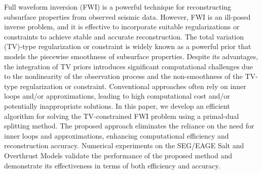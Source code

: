 Full waveform inversion (FWI) is a powerful technique for reconstructing subsurface properties from observed seismic data.
However, FWI is an ill-posed inverse problem, and it is effective to incorporate suitable regularizations or constraints to achieve stable and accurate reconstruction.
The total variation (TV)-type regularization or constraint is widely known as a powerful prior that models the piecewise smoothness of subsurface properties.
Despite its advantages, the integration of TV priors introduces significant computational challenges due to the nonlinearity of the observation process and the non-smoothness of the TV-type regularization or constraint.
Conventional approaches often rely on inner loops and/or approximations, leading to high computational cost and/or potentially inappropriate solutions.
In this paper, we develop an efficient algorithm for solving the TV-constrained FWI problem using a primal-dual splitting method.
The proposed approach eliminates the reliance on the need for inner loops and approximations, enhancing computational efficiency and reconstruction accuracy.
Numerical experiments on the SEG/EAGE Salt and Overthrust Models validate the performance of the proposed method and demonstrate its effectiveness in terms of both efficiency and accuracy.



